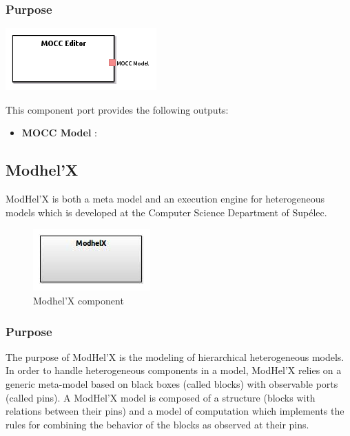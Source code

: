 \documentclass{gemoc} %
\begin{document}
\subsubsection{Purpose}

\begin{center}
\includegraphics*[trim=0.0cm 0.0cm 0cm 0.0cm, clip=true]{../images/generated/Generated_MOCC_Editor.png}
\end{center}


This component port provides the following outputs:
\begin{itemize}
  \item \textbf{MOCC Model} :
\end{itemize}

\subsection{Modhel'X}
ModHel'X is both a meta model and an execution engine for heterogeneous models which is developed at the Computer Science Department of Sup\'elec.

\begin{figure}[htp]
	\begin{center}
	\includegraphics*[trim=0.0cm 0.0cm 0cm 0.0cm, clip=true, scale=1.0]{../images/generated/Generated_Modhel'X.jpg}
	\caption{Modhel'X component}
	\end{center}
\end{figure}

\subsubsection{Purpose}
The purpose of ModHel'X is the modeling of hierarchical heterogeneous models. In order to handle heterogeneous components in a model, ModHel'X relies on a generic meta-model based on black boxes (called blocks) with observable ports (called pins). A ModHel'X model is composed of a structure (blocks with relations between their pins) and a model of computation which implements the rules for combining the behavior of the blocks as observed at their pins.
\end{document}

